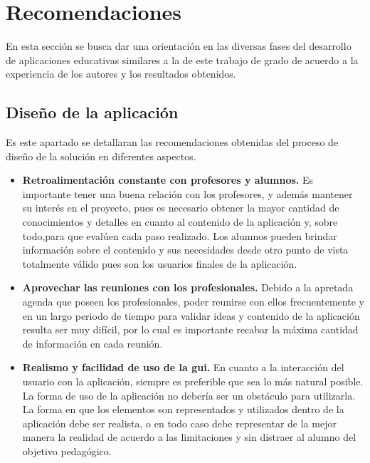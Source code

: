 \section{Recomendaciones}

En esta sección se busca dar una orientación en las diversas fases del
desarrollo de aplicaciones educativas similares a la de este trabajo de grado de
acuerdo a la experiencia de los autores y los resultados obtenidos.

\subsection{Diseño de la aplicación}

Es este apartado se detallaran las recomendaciones obtenidas del proceso de
diseño de la solución en diferentes aspectos. 

\begin{itemize}

\item \textbf{Retroalimentación constante con profesores y alumnos.} Es
    importante tener una buena relación con los profesores, y además mantener su
    interés en el proyecto, pues es necesario obtener la mayor cantidad de
    conocimientos y detalles en cuanto al contenido de la aplicación y, sobre
    todo,para que  evalúen cada paso realizado. Los alumnos pueden brindar
    información sobre el contenido y sus necesidades desde otro punto de vista
    totalmente válido pues son los usuarios finales de la aplicación.

\item \textbf{Aprovechar las reuniones con los profesionales.} Debido a la
    apretada agenda que poseen los profesionales, poder reunirse con ellos
    frecuentemente y en un largo periodo de tiempo para validar ideas y
    contenido de la aplicación resulta ser muy difícil, por lo cual es
    importante recabar la máxima cantidad de información en cada reunión.

\item \textbf{Realismo y facilidad de uso de la \Gls{gui}.} En cuanto a la
    interacción del usuario con la aplicación, siempre es preferible que sea lo
    más natural posible. La forma de uso de la aplicación no debería ser un
    obstáculo para utilizarla. La forma en que los elementos son representados y
    utilizados dentro de la aplicación debe ser realista, o en todo caso debe
    representar de la mejor manera la realidad de acuerdo a las limitaciones y
    sin distraer al alumno del objetivo pedagógico.

\end{itemize}



